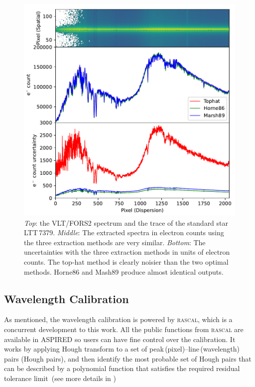 \documentclass[linenumbers, twocolumn]{aastex631}
\begin{document}
\begin{figure}
    \centering
    \includegraphics[width=\columnwidth]{fig_04_extraction_compared.pdf}
    \caption{\textit{Top}: the VLT/FORS2 spectrum and the trace of the standard
    star LTT\,7379. \textit{Middle}: The extracted spectra in electron counts
    using the three extraction methods are very similar. \textit{Bottom}: The
    uncertainties with the three extraction methods in units of electron counts.
    The top-hat method is clearly noisier than the two optimal methods.
    Horne86 and Mash89 produce almost identical outputs.}
    \label{fig:extraction_compared}
\end{figure}

\subsection{Wavelength Calibration}
As mentioned, the wavelength calibration is powered by \textsc{rascal}, which is
a concurrent development to this work. All the public functions from
\textsc{rascal} are available in \textsc{ASPIRED} so users can have fine control
over the calibration. It works by applying Hough transform to a set of
peak\,(pixel)--line\,(wavelength) pairs (Hough pairs), and then identify the
most probable set of Hough pairs that can be described by a polynomial
function that satisfies the required residual tolerance limit~(see more
details in \citealt{2020ASPC..527..627V})
\end{document}
